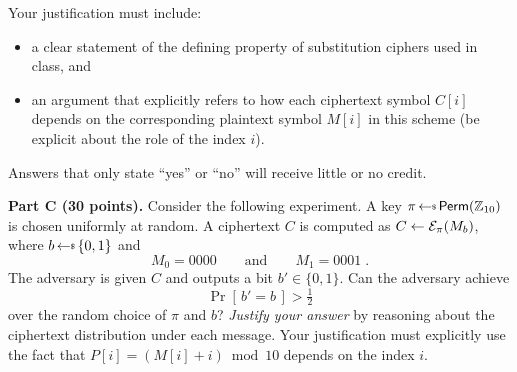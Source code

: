 \documentclass[11pt]{article}
\newcommand{\getsr}{{{\,\leftarrow{\hspace*{-3pt}\raisebox{.75pt}{$\scriptscriptstyle\$$}}\,}}}
\newcommand{\Z}{\mathbb{Z}}
\newcommand{\Prob}[1]{{\Pr\left[\,{#1}\,\right]}}
\newcommand{\calE}{{\cal E}}
\begin{document}
Your justification must include:
\begin{itemize}
  \item a clear statement of the defining property of substitution
        ciphers used in class, and
  \item an argument that explicitly refers to how each ciphertext symbol
        $C[i]$ depends on the corresponding plaintext symbol $M[i]$ in
        this scheme (be explicit about the role of the index $i$).
\end{itemize}

Answers that only state ``yes'' or ``no'' will receive little or no
credit.

\medskip

\noindent
\textbf{Part C (30 points).} Consider the following experiment. A key $\pi \getsr \mathsf{Perm}(\Z_{10})$ is chosen uniformly at random. A ciphertext $C$ is computed as $C \gets \calE_\pi(M_b)$, where
$b \getsr \{0,1\}$ and
$$ M_0 = 0000 \qquad \text{and} \qquad M_1 = 0001 \;. $$
The adversary is given $C$ and outputs a bit $b' \in \{0,1\}$. Can the adversary achieve
$$ \Prob{b' = b} > \tfrac12 $$
over the random choice of $\pi$ and $b$?
\emph{Justify your answer} by reasoning about the ciphertext distribution
under each message. Your justification must explicitly use the fact that
$P[i] = (M[i] + i) \bmod 10$ depends on the index $i$.
\end{document}
